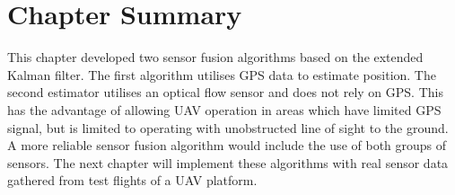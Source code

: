 \FloatBarrier

\section{Chapter Summary}
This chapter developed two sensor fusion algorithms based on the extended Kalman filter. The first algorithm utilises GPS data to estimate position. The second estimator utilises an optical flow sensor and does not rely on GPS. This has the advantage of allowing UAV operation in areas which have limited GPS signal, but is limited to operating with unobstructed line of sight to the ground. A more reliable sensor fusion algorithm would include the use of both groups of sensors. The next chapter will implement these algorithms with real sensor data gathered from test flights of a UAV platform.

\clearpage


